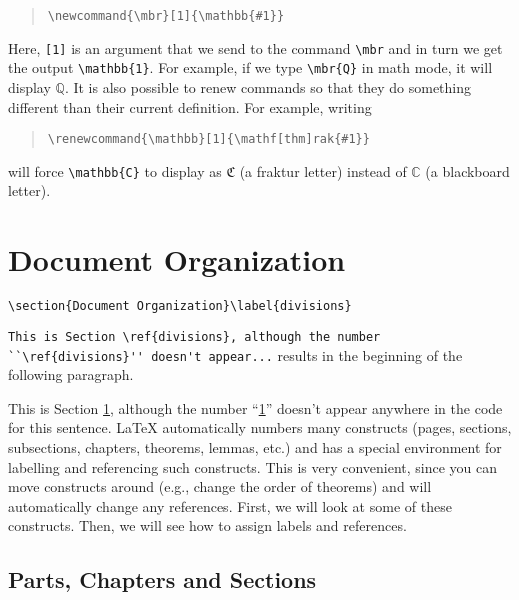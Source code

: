 \documentclass[letterpaper,twoside,10pt]{article}
\begin{document}
\begin{quote}
 \verb!\newcommand{\mbr}[1]{\mathbb{#1}}!
\end{quote}

\newcommand{\mbr}[1]{\mathbb{#1}}

Here, \texttt{[1]} is an argument that we send to the command \verb!\mbr! and in turn we get the
output \verb!\mathbb{1}!. For example, if we type \verb!\mbr{Q}! in math mode, it will display
$\mbr{Q}$. It is also possible to renew commands so that they do something different than their
current definition. For example, writing

\begin{quote}
 \verb!\renewcommand{\mathbb}[1]{\mathf[thm]rak{#1}}!
\end{quote}

will force \verb!\mathbb{C}! to display as $\mathfrak{C}$ (a fraktur letter) instead of $\mathbb{C}$
(a blackboard letter).





\section{Document Organization}\label{divisions}

{\small\verb!\section{Document Organization}\label{divisions}!}

\medbreak
{\small\verb!This is Section \ref{divisions}, although the number ``\ref{divisions}'' doesn't appear...!
} results in the beginning of the following paragraph.

\bigbreak This is Section \ref{divisions}, although the number ``\ref{divisions}'' doesn't appear
anywhere in the code for this sentence. {\LaTeX} automatically numbers many constructs (pages,
sections, subsections, chapters, theorems, lemmas, etc.) and has a special environment for labelling
and referencing such constructs. This is very convenient, since you can move constructs around
(e.g., change the order of theorems) and {\LaTeXe} will automatically change any references. First,
we will look at some of these constructs. Then, we will see how to assign labels and references.

\subsection[Parts, Chapters \& Sections]{Parts, Chapters and Sections}\label{parts}
\end{document}
